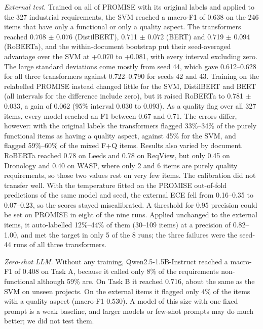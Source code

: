 \documentclass[conference,10pt,letterpaper]{IEEEtran}
\begin{document}
\emph{External test.} Trained on all of PROMISE with its original labels and applied to the 327 industrial requirements, the SVM reached a macro-F1 of 0.638 on the 246 items that have only a functional or only a quality aspect. The transformers reached 0.708 $\pm$ 0.076 (DistilBERT), 0.711 $\pm$ 0.072 (BERT) and 0.719 $\pm$ 0.094 (RoBERTa), and the within-document bootstrap put their seed-averaged advantage over the SVM at +0.070 to +0.081, with every interval excluding zero. The large standard deviations come mostly from seed 44, which gave 0.612–0.628 for all three transformers against 0.722–0.790 for seeds 42 and 43. Training on the relabelled PROMISE instead changed little for the SVM, DistilBERT and BERT (all intervals for the difference include zero), but it raised RoBERTa to 0.781 $\pm$ 0.033, a gain of 0.062 (95\% interval 0.030 to 0.093). As a quality flag over all 327 items, every model reached an F1 between 0.67 and 0.71. The errors differ, however: with the original labels the transformers flagged 33\%–34\% of the purely functional items as having a quality aspect, against 45\% for the SVM, and flagged 59\%–60\% of the mixed F+Q items. Results also varied by document. RoBERTa reached 0.78 on Leeds and 0.78 on ReqView, but only 0.45 on Dronology and 0.40 on WASP, where only 2 and 6 items are purely quality requirements, so those two values rest on very few items. The calibration did not transfer well. With the temperature fitted on the PROMISE out-of-fold predictions of the same model and seed, the external ECE fell from 0.16–0.35 to 0.07–0.23, so the scores stayed miscalibrated. A threshold for 0.95 precision could be set on PROMISE in eight of the nine runs. Applied unchanged to the external items, it auto-labelled 12\%–44\% of them (30–109 items) at a precision of 0.82–1.00, and met the target in only 5 of the 8 runs; the three failures were the seed-44 runs of all three transformers.

\emph{Zero-shot LLM.} Without any training, Qwen2.5-1.5B-Instruct reached a macro-F1 of 0.408 on Task A, because it called only 8\% of the requirements non-functional although 59\% are. On Task B it reached 0.716, about the same as the SVM on unseen projects. On the external items it flagged only 4\% of the items with a quality aspect (macro-F1 0.530). A model of this size with one fixed prompt is a weak baseline, and larger models or few-shot prompts may do much better; we did not test them.
\end{document}
